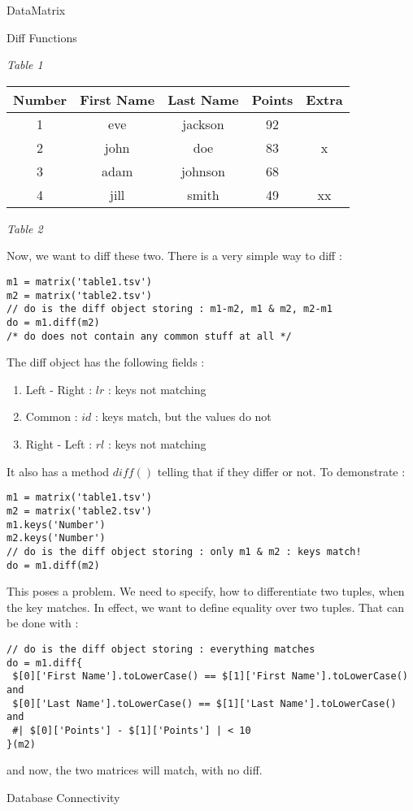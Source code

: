 \begin{section}{DataMatrix}
\begin{subsection}{Diff Functions}
\begin{center}
\emph{ Table 1 }


\begin{tabular}{ |c|c|c|c|c| } 
 \hline
 Number	& First Name & Last Name & Points & Extra \\ 
 \hline 
   1    & eve	     & jackson	& 92      & \\
   2    & john       & doe	    & 83      &  x \\ 
   3    & adam       & johnson	& 68      &  \\	
   4    & jill       & smith	& 49      & xx \\  
 \hline
\end{tabular}

\emph{ Table 2 }

\end{center}

Now, we want to diff these two. There is a very simple way to diff :

\begin{lstlisting}[style=JexlStyle]
m1 = matrix('table1.tsv')
m2 = matrix('table2.tsv')
// do is the diff object storing : m1-m2, m1 & m2, m2-m1 
do = m1.diff(m2)
/* do does not contain any common stuff at all */
\end{lstlisting}

The diff object has the following fields :
\begin{enumerate}
\item{Left - Right : $lr$ : keys not matching }
\item{Common : $id$ : keys match, but the values do not}
\item{Right - Left : $rl$ : keys not matching }
\end{enumerate}
It also has a method $diff()$ telling that if they differ or not. 
To demonstrate :

\begin{lstlisting}[style=JexlStyle]
m1 = matrix('table1.tsv')
m2 = matrix('table2.tsv')
m1.keys('Number')
m2.keys('Number')
// do is the diff object storing : only m1 & m2 : keys match! 
do = m1.diff(m2)
\end{lstlisting}

This poses a problem. We need to specify, how to differentiate two tuples, 
when the key matches. In effect, we want to define equality over two tuples.
That can be done with :

\begin{lstlisting}[style=JexlStyle]
// do is the diff object storing : everything matches 
do = m1.diff{    
 $[0]['First Name'].toLowerCase() == $[1]['First Name'].toLowerCase() and 
 $[0]['Last Name'].toLowerCase() == $[1]['Last Name'].toLowerCase() and 
 #| $[0]['Points'] - $[1]['Points'] | < 10   
}(m2)
\end{lstlisting}
and now, the two matrices will match, with no diff.


\end{subsection}


\end{section}

\begin{section}{Database Connectivity}
\end{section}
